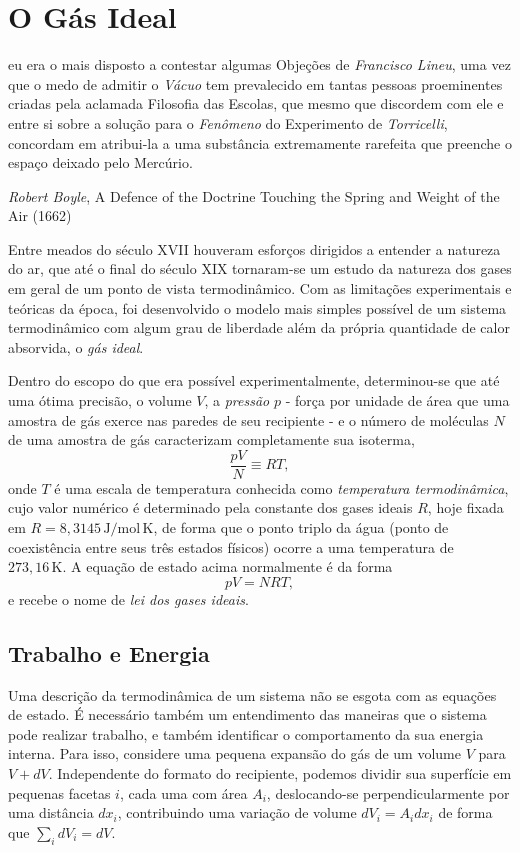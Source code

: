 \documentclass[a4paper, 12pt]{article}
\theoremstyle{definition}
\theoremstyle{definition}
\begin{document}
\section{O Gás Ideal}
\epigraph{\justifying [...] eu era o mais disposto a contestar algumas Objeções de 
\textit{Francisco Lineu}, uma vez que o medo de admitir o \textit{Vácuo} tem prevalecido em 
tantas pessoas proeminentes criadas pela aclamada Filosofia das Escolas, que mesmo que discordem 
com ele e entre si sobre a solução para o \textit{Fenômeno} do Experimento de \textit{Torricelli},
concordam em atribui-la a uma substância extremamente rarefeita que preenche o espaço deixado
pelo Mercúrio.}{\textit{Robert Boyle}, A Defence of the Doctrine Touching the Spring and Weight
of the Air (1662)}

\noindent Entre meados do século XVII houveram esforços dirigidos a entender a natureza do ar, que
até o final do século XIX tornaram-se um estudo da natureza dos gases em geral de um ponto de vista
termodinâmico. Com as limitações experimentais e teóricas da época, foi desenvolvido o modelo mais
simples possível de um sistema termodinâmico com algum grau de liberdade além da própria quantidade
de calor absorvida, o \textit{gás ideal}. 

Dentro do escopo do que era possível experimentalmente, determinou-se que até uma ótima precisão, o 
volume $V$, a \textit{pressão} $p$ - força por unidade de área que uma amostra de gás exerce nas paredes 
de seu recipiente - e o número de moléculas $N$ de uma amostra de gás caracterizam completamente 
sua isoterma, 
$$\frac{pV}{N}\equiv RT,$$
onde $T$ é uma escala de temperatura conhecida como \textit{temperatura termodinâmica}, cujo valor numérico
é determinado pela constante dos gases ideais $R$, hoje fixada em $R=8{,}3145\,\mathrm{J/mol\,K}$, de 
forma que o ponto triplo da água (ponto de coexistência entre seus três estados físicos) ocorre a uma 
temperatura de $273{,}16\,\mathrm K$. A equação de estado acima normalmente é da forma
$$pV=NRT,$$
e recebe o nome de \textit{lei dos gases ideais}.

\subsection{Trabalho e Energia}

Uma descrição da termodinâmica de um sistema não se esgota com as equações de estado. É
necessário também um entendimento das maneiras que o sistema pode realizar trabalho, e também
identificar o comportamento da sua energia interna. Para isso, considere uma pequena expansão
do gás de um volume $V$ para $V+dV$. Independente do formato do recipiente, podemos dividir sua
superfície em pequenas facetas $i$, cada uma com área $A_i$, deslocando-se perpendicularmente
por uma distância $dx_i$, contribuindo uma variação de volume $dV_i=A_idx_i$ de forma que
$\sum_idV_i=dV$.
\end{document}
